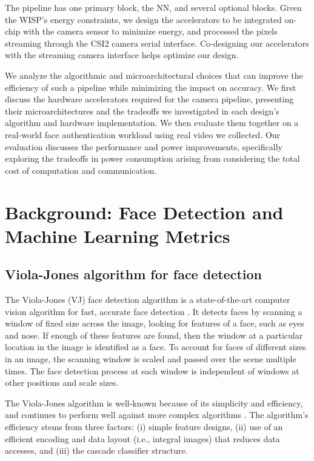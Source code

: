 The pipeline has one primary block, the NN, and several optional blocks.
Given the WISP's energy constraints, we design the accelerators to be integrated on-chip with the camera sensor to minimize energy, and processed the pixels streaming through the CSI2 camera serial interface.
Co-designing our accelerators with the streaming camera interface helps optimize our design.

We analyze the algorithmic and microarchitectural choices that can improve the efficiency of such a pipeline while minimizing the impact on accuracy.
We first discuss the hardware accelerators required for the camera pipeline, presenting their microarchitectures and the tradeoffs we investigated in each design's algorithm and hardware implementation.
We then evaluate them together on a real-world face authentication workload using real video we collected.
Our evaluation discusses the performance and power improvements, specifically exploring the tradeoffs in power consumption arising from considering the total cost of computation and communication.

\section{Background: Face Detection and Machine Learning Metrics}
\label{sec:backvj}

\subsection{Viola-Jones algorithm for face detection}

The Viola-Jones (VJ) face detection algorithm is a state-of-the-art computer vision algorithm for fast, accurate face detection \cite{vj_journal}. It detects faces by scanning a window of fixed size across the image, looking for features of a face, such as eyes and nose. If enough of these features are found, then the window at a particular location in the image is identified as a face. To account for faces of different sizes in an image, the scanning window is scaled and passed over the scene multiple times. The face detection process at each window is independent of windows at other positions and scale sizes.

The Viola-Jones algorithm is well-known because of its simplicity and efficiency,
and continues to perform well against more complex algorithms \cite{mathias_fd}.
The algorithm's efficiency stems from three factors: (i) simple feature
designs, (ii) use of an efficient encoding and data layout (i.e., integral images) that reduces data accesses, and (iii) the cascade classifier structure.

